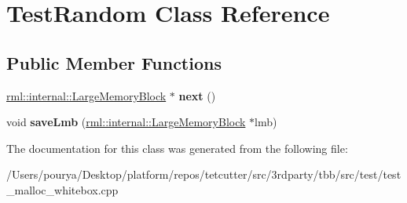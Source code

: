 \hypertarget{classTestRandom}{}\section{Test\+Random Class Reference}
\label{classTestRandom}
\subsection*{Public Member Functions}
\begin{DoxyCompactItemize}
\item 
\hypertarget{classTestRandom_ac89ce16cd37b7b0c007e926970480690}{}\hyperlink{structrml_1_1internal_1_1LargeMemoryBlock}{rml\+::internal\+::\+Large\+Memory\+Block} $\ast$ {\bfseries next} ()\label{classTestRandom_ac89ce16cd37b7b0c007e926970480690}

\item 
\hypertarget{classTestRandom_a21cc6398a4ed6e7040a73b2362d90a10}{}void {\bfseries save\+Lmb} (\hyperlink{structrml_1_1internal_1_1LargeMemoryBlock}{rml\+::internal\+::\+Large\+Memory\+Block} $\ast$lmb)\label{classTestRandom_a21cc6398a4ed6e7040a73b2362d90a10}

\end{DoxyCompactItemize}


The documentation for this class was generated from the following file\+:\begin{DoxyCompactItemize}
\item 
/\+Users/pourya/\+Desktop/platform/repos/tetcutter/src/3rdparty/tbb/src/test/test\+\_\+malloc\+\_\+whitebox.\+cpp\end{DoxyCompactItemize}
